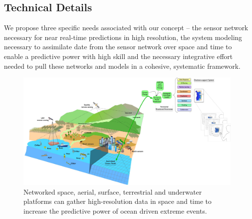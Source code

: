 \subsection*{Technical Details}

We propose three specific needs associated with our concept -- the
sensor network necessary for near real-time predictions in high
resolution, the system modeling necessary to assimilate date from the
sensor network over space and time to enable a predictive power with
high skill and the necessary integrative effort needed to pull these
networks and models in a cohesive, systematic framework. 

\begin{figure}
  \centering
  \includegraphics[scale=0.30]{fig/Coastal-connect.jpg}
  \caption{Networked space, aerial, surface, terrestrial and underwater
    platforms can gather high-resolution data in space and time to
    increase the predictive power of ocean driven extreme events.}
  \label{fig:coastal-res}
\end{figure}




